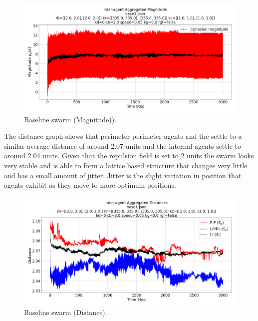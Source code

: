 \documentclass[12pt,a4paper]{IEEEtran}
\begin{document}
\begin{figure}[H]
	\begin{center}
		\includegraphics[width=1.0\linewidth]{figures/baselineMagnitude}
	\end{center}
	\caption{Baseline swarm (Magnitude)). \label{fig:baselineMagnitude}}
\end{figure}

The distance graph shows that perimeter-perimeter agents and the settle to a similar average distance of around 2.07 units and the internal agents settle to around 2.04 units. Given that the repulsion field is set to 2 units the swarm looks very stable and is able to form a lattice based structure that changes very little and has a small amount of jitter. Jitter is the slight variation in position that agents exhibit as they move to more optimum positions.

\begin{figure}[H]
	\begin{center}
		\includegraphics[width=1.0\linewidth]{figures/baselineDistance}
	\end{center}
	\caption{Baseline swarm (Distance). \label{fig:baselineDistance}}
\end{figure}
\end{document}
